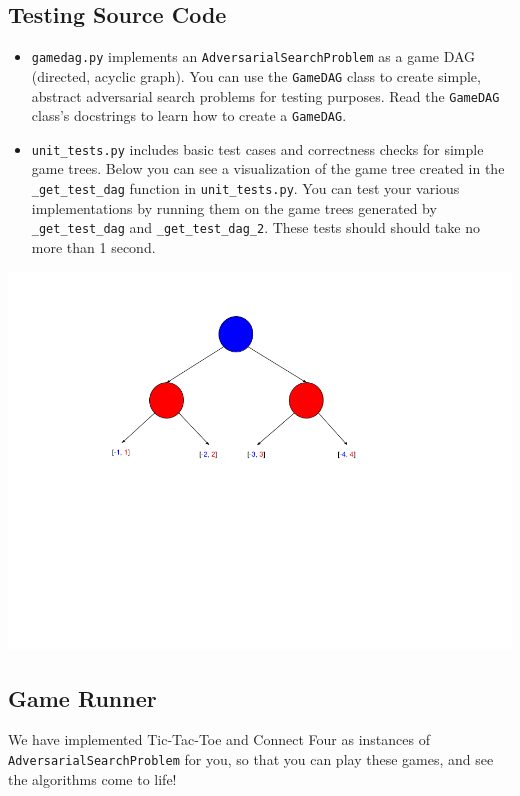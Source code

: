 \documentclass{article}
\begin{document}
\subsection{Testing Source Code}
\begin{itemize}
  \item \verb|gamedag.py| implements an \verb|AdversarialSearchProblem| as a game DAG (directed, acyclic graph).
    You can use the \verb|GameDAG| class to create simple, abstract adversarial search problems for testing purposes.
    Read the \verb|GameDAG| class's docstrings to learn how to create a \verb|GameDAG|.

  \item \verb|unit_tests.py| includes basic test cases and correctness checks for simple game trees.
    Below you can see a visualization of the game tree created in the \verb|_get_test_dag| function in \verb|unit_tests.py|.
    You can test your various implementations by running them on the game trees generated by
    \verb|_get_test_dag| and \verb|_get_test_dag_2|.
    These tests should should take no more than 1 second.
\end{itemize}

\centerline{\includegraphics[scale = 0.33]{example-DAG.png}}


\mbox{}
\vspace{-1.75in}

\subsection{Game Runner}\label{gamerunner}
We have implemented Tic-Tac-Toe and Connect Four as instances of \verb|AdversarialSearchProblem| for you,
so that you can play these games, and see the algorithms come to life!
\end{document}

